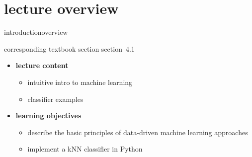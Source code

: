 


\subtitle{Module 4.1: Classification}


	

    \section[overview]{lecture overview}
        \begin{frame}{introduction}{overview}
            \begin{block}{corresponding textbook section}
                    section~4.1
            \end{block}

            \begin{itemize}
                \item   \textbf{lecture content}
                    \begin{itemize}
                        \item   intuitive intro to machine learning
                        \item   classifier examples
                    \end{itemize}
                \bigskip
                \item<2->   \textbf{learning objectives}
                    \begin{itemize}
                        \item   describe the basic principles of data-driven machine learning approaches
                        \item   implement a kNN classifier in Python
                    \end{itemize}
            \end{itemize}
        \end{frame}

